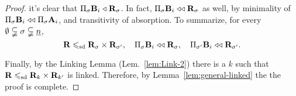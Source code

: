 \begin{proof}
  it's clear that  $\Pi_{\sigma}\mathbf{B}_i \mathrel{\triangleleft} \mathbf{R}_{\sigma}$.
  In fact, $\Pi_{\sigma}\mathbf{B}_i \mathrel{\triangleleft\triangleleft} \mathbf{R}_{\sigma}$ as well, 
  by minimality of
  $\Pi_{\sigma}\mathbf{B}_i \mathrel{\triangleleft\triangleleft} \Pi_{\sigma}\mathbf{A}_{i}$,
  and transitivity of absorption.
  To summarize, for every $\emptyset \subsetneqq \sigma\subsetneqq \underline{n}$,
  \begin{equation}
    \label{eq:20}
  \bR \sdp \bR_{\sigma} \times \bR_{\sigma'}, \quad
  \myprod_\sigma \bB_i \minabsorbing \bR_{\sigma}, \quad
  \myprod_{\sigma'} \bB_i \minabsorbing \bR_{\sigma'}.
  \end{equation}

  Finally, by the Linking Lemma (Lem.~\ref{lem:Link-2}) there
  is a $k$ such that 
  $\mathbf{R} \leqslant_{\mathrm{sd}} \mathbf{R}_{k} \times \mathbf{R}_{k'}$ is linked.  Therefore,
  by Lemma~\ref{lem:general-linked} the
  the proof is complete.
\end{proof}


